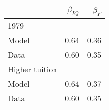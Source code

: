 \begin{tabular}{lrr}
\hline
  & $\beta_{IQ}$  & $\beta_{F}$  \\ 
\hline
1979 &   &   \\ 
Model & 0.64  & 0.36  \\ 
Data & 0.60  & 0.35  \\ 
Higher tuition &   &   \\ 
Model & 0.64  & 0.37  \\ 
Data & 0.60  & 0.35  \\ 
\hline
\end{tabular}%
